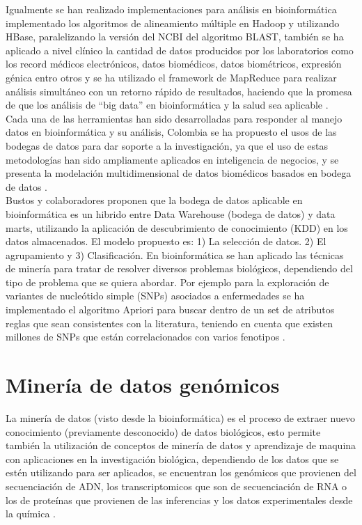 Igualmente se han realizado implementaciones para análisis  en bioinformática implementado los algoritmos de alineamiento múltiple en Hadoop  y utilizando HBase, paralelizando la versión del NCBI del algoritmo BLAST, también se ha aplicado a nivel clínico la cantidad de datos producidos por los laboratorios como los record médicos electrónicos, datos biomédicos, datos biométricos, expresión génica entro otros y  se ha utilizado el framework de MapReduce para realizar análisis simultáneo con un retorno rápido de resultados, haciendo que la promesa de que los análisis de “big data”  en bioinformática y la salud sea aplicable \cite{Mohammed2014}.\\

Cada una de las herramientas han sido desarrolladas para responder al manejo datos en bioinformática y su análisis,  Colombia se ha propuesto el usos de las bodegas de datos para dar soporte a la investigación, ya que el uso de estas metodologías han sido ampliamente aplicados en inteligencia de negocios, y se presenta la modelación multidimensional de datos biomédicos basados en bodega de datos \cite{Bustos2007}.\\

Bustos \cite{Bustos2007}  y colaboradores proponen que la bodega de datos aplicable en bioinformática es  un hibrido entre Data Warehouse (bodega de datos) y data marts, utilizando la aplicación de descubrimiento de conocimiento (KDD) en los datos almacenados. El modelo propuesto es: 1) La selección de datos. 2) El agrupamiento y 3) Clasificación. En bioinformática se han aplicado las técnicas de minería para tratar de resolver diversos problemas biológicos, dependiendo del tipo de problema que se quiera abordar. Por ejemplo para la exploración de variantes de nucleótido simple (SNPs) asociados a enfermedades se ha implementado el algoritmo Apriori para buscar dentro de un set de atributos reglas que sean consistentes con la literatura, teniendo en cuenta que existen millones de SNPs que están correlacionados con varios fenotipos \cite{Staccini2014}.

\section{Minería de datos genómicos}

La minería de datos (visto desde la bioinformática) es  el proceso de extraer nuevo conocimiento (previamente desconocido) de datos biológicos, esto permite también la utilización de conceptos de minería de datos y aprendizaje de maquina  con aplicaciones en la investigación biológica, dependiendo de los datos que se estén utilizando para ser aplicados, se encuentran los genómicos que provienen del secuenciación de ADN, los transcriptomicos que son de secuenciación de RNA o los de proteínas que provienen de las inferencias y los datos experimentales desde la química \cite{Farid2016}. \\ 

